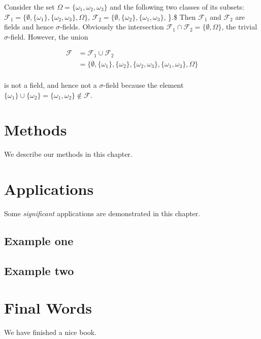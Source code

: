 \documentclass[b5paper,]{scrbook}
\theoremstyle{definition}
\theoremstyle{definition}
\theoremstyle{definition}
\theoremstyle{remark}
\begin{document}
Consider the set \(\Omega=\{\omega_{1},\omega_{2},\omega_{3}\}\) and the following two classes of its subsets: \(\mathcal{F}_{1}=\{\emptyset, \{\omega_{1}\}, \{\omega_{2},\omega_{3}\}, \Omega \}\), \(\mathcal{F}_{2}=\{\emptyset, \{\omega_{2}\}, \{\omega_{1},\omega_{3}\}\), \Omega \}.\$ Then \(\mathcal{F}_{1}\) and \(\mathcal{F}_{2}\) are fields and hence \(\sigma\)-fields. Obviously the intersection \(\mathcal{F}_{1}\cap \mathcal{F}_{2} =\{ \emptyset, \Omega \}\), the trivial \(\sigma\)-field. However, the union

\begin{align*}
\mathcal{F}&=\mathcal{F}_{1} \cup \mathcal{F}_{2}\\
&= \{\emptyset, \{\omega_{1}\}, \{\omega_{2}\}, \{\omega_{2},\omega_{3} \}, \{\omega_{1},\omega_{3} \},\Omega \}\\
\end{align*}

is not a field, and hence not a \(\sigma\)-field because the element \(\{\omega_{1}\}\cup \{\omega_{2}\}=\{\omega_{1},\omega_{2}\}\notin\mathcal{F}\).

\hypertarget{methods}{%
\chapter{Methods}\label{methods}}

We describe our methods in this chapter.

\hypertarget{applications}{%
\chapter{Applications}\label{applications}}

Some \emph{significant} applications are demonstrated in this chapter.

\hypertarget{example-one}{%
\section{Example one}\label{example-one}}

\hypertarget{example-two}{%
\section{Example two}\label{example-two}}

\hypertarget{final-words}{%
\chapter{Final Words}\label{final-words}}

We have finished a nice book.


\end{document}
